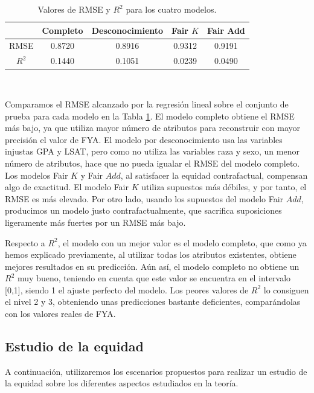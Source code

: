 \documentclass[oneside,openright,titlepage,numbers=noenddot,openany,headinclude,footinclude=true,
cleardoublepage=empty,abstractoff,BCOR=5mm,paper=a4,fontsize=12pt,main=spanish]{scrreprt}
\begin{document}
\begin{table}[h]
\centering
\resizebox{12.1cm}{!} {
\begin{tabular}{ccccc}
\hline
      & \textbf{Completo} & \textbf{Desconocimiento} & \textbf{Fair $K$} & \textbf{Fair Add} \\ \hline
RMSE  & 0.8720         & 0.8916                   & 0.9312            & 0.9191            \\ \hline
$R^2$ & 0.1440         & 0.1051                   & 0.0239            & 0.0490            \\ \hline
\end{tabular}
}
\caption{Valores de RMSE y $R^2$ para los cuatro modelos.}
\label{tab:coeficientes}
\end{table}\

Comparamos el RMSE alcanzado por la regresión lineal sobre el conjunto de prueba para cada modelo en la Tabla \ref{tab:coeficientes}. El modelo completo obtiene el RMSE más bajo, ya que utiliza mayor número de atributos para reconstruir con mayor precisión el valor de FYA. El modelo por desconocimiento usa las variables injustas GPA y LSAT, pero como no utiliza las variables raza y sexo, un menor número de atributos, hace que no pueda igualar el RMSE del modelo completo. Los modelos Fair $K$ y Fair $Add$, al satisfacer la equidad contrafactual, compensan algo de exactitud. El modelo Fair $K$ utiliza supuestos más débiles, y por tanto, el RMSE es más elevado. Por otro lado, usando los supuestos del modelo Fair $Add$, producimos un modelo justo contrafactualmente, que sacrifica suposiciones ligeramente más fuertes por un RMSE más bajo. 

Respecto a $R^2$, el modelo con un mejor valor es el modelo completo, que como ya hemos explicado previamente, al utilizar todas los atributos existentes, obtiene mejores resultados en su predicción. Aún así, el modelo completo no obtiene un $R^2$ muy bueno, teniendo en cuenta que este valor se encuentra en el intervalo [0,1], siendo 1 el ajuste perfecto del modelo. Los peores valores de $R^2$ lo consiguen el nivel 2 y 3, obteniendo unas predicciones bastante deficientes, comparándolas con los valores reales de FYA.

\subsection{Estudio de la equidad}

A continuación, utilizaremos los escenarios propuestos para realizar un estudio de la equidad sobre los diferentes aspectos estudiados en la teoría. 
\end{document}
